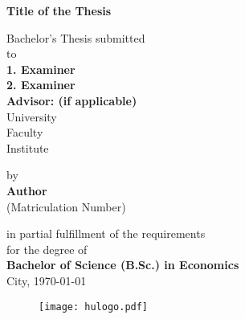 
\begin{titlepage}
		\pagestyle{empty}
		\begin{center}

		    {\Large{\bf Title of the Thesis}} \vspace{0.5cm}


		    {\normalsize Bachelor's Thesis submitted\\\vspace{0.5cm}
		    to}\\\vspace{0.5cm}
		    {\normalsize{\bf
			   	 1. Examiner \\
		 	     2. Examiner \\\vspace{0.5cm}
	 		     Advisor: (if applicable)}}\\\vspace{0.5cm}
		    {\normalsize University \\
		    Faculty \\
		    Institute} \vspace{1cm}


		    {\normalsize by \\\vspace{0.5cm}
		    {\bf Author} \\
		    (Matriculation Number)} \vspace{1cm}


		    {\normalsize in partial fulfillment of the requirements \\
		    for the degree of \\
		    {\bf Bachelor of Science (B.Sc.) in Economics} \\ 
		    City, \today} %
		    
		    \begin{figure}[!b]
		    \centering
		    \begin{minipage}{0.45\textwidth}
		        \centering
		        \texttt{[image: hulogo.pdf]} %
		    \end{minipage}\hfill
		\end{figure}

\end{center}
\end{titlepage}
